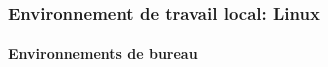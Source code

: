 \documentclass{beamer}
\begin{document}
\begin{frame}
\begin{tabular}{llll}
\end{tabular}

\end{frame}

\begin{frame}
\frametitle{Environnement de travail local: Linux}
\framesubtitle{Environnements de bureau}

\end{frame}





%
% 
\end{document}
